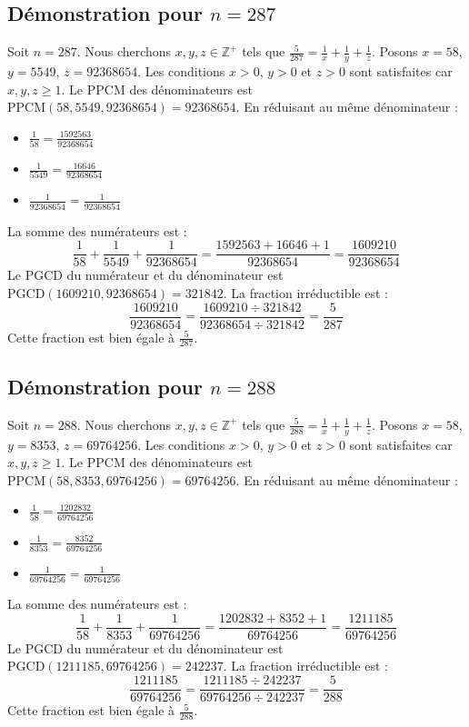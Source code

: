 \documentclass[11pt,a4paper]{article}
\begin{document}
\subsection{Démonstration pour $n = 287$}
Soit $n = 287$. Nous cherchons $x, y, z \in \mathbb{Z}^{+}$ tels que $\frac{5}{287} = \frac{1}{x} + \frac{1}{y} + \frac{1}{z}$.
Posons $x = 58$, $y = 5549$, $z = 92368654$.
Les conditions $x > 0$, $y > 0$ et $z > 0$ sont satisfaites car $x, y, z \geq 1$.
Le PPCM des dénominateurs est $\text{PPCM}(58, 5549, 92368654) = 92368654$.
En réduisant au même dénominateur :
\begin{itemize}
    \item $\frac{1}{58} = \frac{1592563}{92368654}$
    \item $\frac{1}{5549} = \frac{16646}{92368654}$
    \item $\frac{1}{92368654} = \frac{1}{92368654}$
\end{itemize}
La somme des numérateurs est :
$$ \frac{1}{58} + \frac{1}{5549} + \frac{1}{92368654} = \frac{1592563 + 16646 + 1}{92368654} = \frac{1609210}{92368654} $$
Le PGCD du numérateur et du dénominateur est $\text{PGCD}(1609210, 92368654) = 321842$.
La fraction irréductible est :
$$ \frac{1609210}{92368654} = \frac{1609210 \div 321842}{92368654 \div 321842} = \frac{5}{287} $$
Cette fraction est bien égale à $\frac{5}{287}$.

\subsection{Démonstration pour $n = 288$}
Soit $n = 288$. Nous cherchons $x, y, z \in \mathbb{Z}^{+}$ tels que $\frac{5}{288} = \frac{1}{x} + \frac{1}{y} + \frac{1}{z}$.
Posons $x = 58$, $y = 8353$, $z = 69764256$.
Les conditions $x > 0$, $y > 0$ et $z > 0$ sont satisfaites car $x, y, z \geq 1$.
Le PPCM des dénominateurs est $\text{PPCM}(58, 8353, 69764256) = 69764256$.
En réduisant au même dénominateur :
\begin{itemize}
    \item $\frac{1}{58} = \frac{1202832}{69764256}$
    \item $\frac{1}{8353} = \frac{8352}{69764256}$
    \item $\frac{1}{69764256} = \frac{1}{69764256}$
\end{itemize}
La somme des numérateurs est :
$$ \frac{1}{58} + \frac{1}{8353} + \frac{1}{69764256} = \frac{1202832 + 8352 + 1}{69764256} = \frac{1211185}{69764256} $$
Le PGCD du numérateur et du dénominateur est $\text{PGCD}(1211185, 69764256) = 242237$.
La fraction irréductible est :
$$ \frac{1211185}{69764256} = \frac{1211185 \div 242237}{69764256 \div 242237} = \frac{5}{288} $$
Cette fraction est bien égale à $\frac{5}{288}$.
\end{document}
